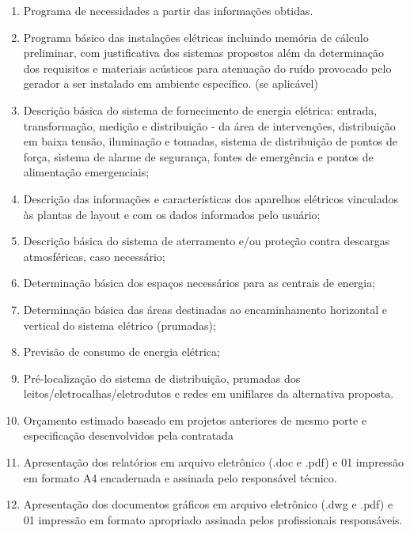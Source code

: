 \begin{enumerate}
\begin{enumerate}
			\item Programa de necessidades a partir das informações obtidas.
			
			\item Programa básico das instalações elétricas incluindo memória de cálculo preliminar, com justificativa dos sistemas propostos além da determinação dos requisitos e materiais acústicos para atenuação do ruído provocado pelo gerador a ser instalado em ambiente específico. (se aplicável)			
	
			\item Descrição básica do sistema de fornecimento de energia elétrica: entrada, transformação, medição e distribuição - da área de intervenções, distribuição em baixa tensão, iluminação e tomadas, sistema de distribuição de pontos de força, sistema de alarme de segurança, fontes de emergência e pontos de alimentação emergenciais; 
			
			\item Descrição das informações e características dos aparelhos elétricos vinculados às plantas de layout e com os dados informados pelo usuário; 
			
			\item Descrição básica do sistema de aterramento e/ou proteção contra descargas atmosféricas, caso necessário;
			
			\item Determinação básica dos espaços necessários para as centrais de energia;
			
			\item Determinação básica das áreas destinadas ao encaminhamento horizontal e vertical do sistema elétrico (prumadas);
			
			\item Previsão de consumo de energia elétrica;
			
			\item Pré-localização do sistema de distribuição, prumadas dos leitos/eletrocalhas/eletrodutos e redes em unifilares da alternativa proposta.
			
			\item Orçamento estimado baseado em projetos anteriores de mesmo porte e especificação desenvolvidos pela contratada
			
			\item Apresentação dos relatórios em arquivo eletrônico (.doc e .pdf) e 01 impressão em formato A4 encadernada e assinada pelo responsável técnico.
			
			\item Apresentação dos documentos gráficos em arquivo eletrônico (.dwg e .pdf) e 01 impressão em formato apropriado assinada pelos profissionais responsáveis.

		\end{enumerate}
	
\end{enumerate}

